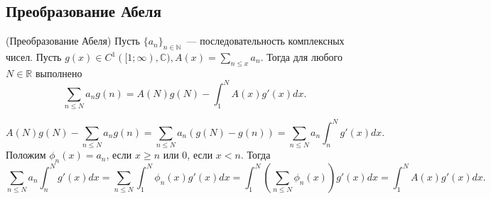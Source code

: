 \subsection{Преобразование Абеля}
\begin{lemma}(Преобразование Абеля) \label{l3_Abel_transform}
	Пусть $\lbrace a_n \rbrace_{n \in \mathbb{N}}$ — последовательность комплексных чисел. Пусть $\displaystyle g(x) \in C^1([1; \infty), \mathbb{C}), A(x) = \sum\limits_{n \leq x} a_n$. Тогда для любого $N \in \mathbb{R}$ выполнено
	$$\sum_{n \leq N} a_n g(n) = A(N) g(N) - \int_{1}^{N} A(x) g'(x) dx.$$
\end{lemma}
\begin{pf}
	$$A(N) g(N)- \sum_{n \leq N} a_n g(n) = \sum_{n \leq N} a_n (g(N) - g(n)) = \sum_{n \leq N} a_n \int_{n}^{N} g'(x) dx.$$
	Положим $\phi_n(x)= a_n$, если $x \geq n$ или 0, если $x < n$. Тогда
	$$\sum_{n \leq N} a_n \int_{n}^{N} g'(x) dx = \sum_{n \leq N} \int_{1}^{N} \phi_n(x) g'(x) dx = \int_{1}^{N} \left( \sum_{n \leq N} \phi_n(x) \right) g'(x) dx = \int_{1}^{N} A(x) g'(x) dx.$$
\end{pf}

